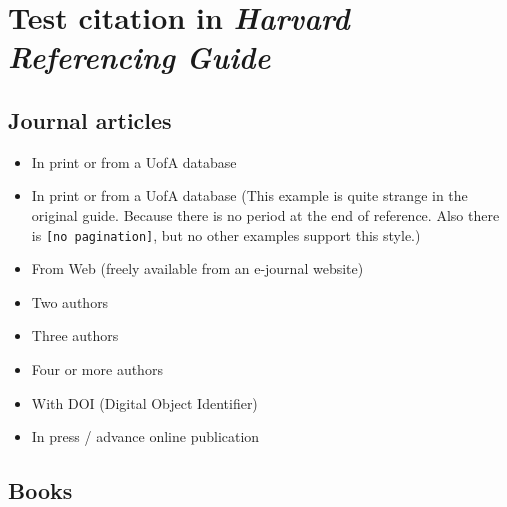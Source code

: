 \documentclass[a4paper]{article}
\begin{document}
\section{Test citation in \em{Harvard Referencing Guide}}

\subsection{Journal articles}

\begin{itemize}
    \item \textbf{\citep[p.~\#]{habel2009academic}} In print or from a UofA database
    \item \textbf{\citep[p.~6789-3]{waqas2022damage}} In print or from a UofA database (This example is quite strange in the original guide.
    Because there is no period at the end of reference. Also there is \texttt{[no pagination]}, but no other examples support this style.)
    \item \textbf{\citep[p.~\#]{ticker2017music}} From Web (freely available from an e-journal website)
    \item \textbf{\citep[p.~\#]{darwin2009mentoring}} Two authors
    \item \textbf{\citep[p.~\#]{maier2007using}} Three authors
    \item \textbf{\citep[p.~\#]{grosso2017coffee}} Four or more authors
    \item \textbf{\citep[p.~\#]{lee2017relationship}} With DOI (Digital Object Identifier)
    \item \textbf{\citep[pp.~\#--\#]{muldoon2013longitudinal}} In press / advance online publication
\end{itemize}

\subsection{Books}
\end{document}
